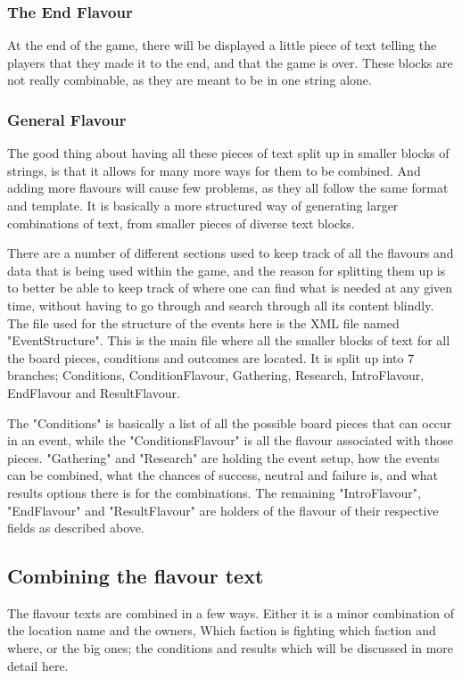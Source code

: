 \subsubsection{The End Flavour}
At the end of the game, there will be displayed a little piece of text telling the players that they made it to the end, and that the game is over. These blocks are not really combinable, as they are meant to be in one string alone.

\subsubsection{General Flavour}
The good thing about having all these pieces of text split up in smaller blocks of strings, is that it allows for many more ways for them to be combined. And adding more flavours will cause few problems, as they all follow the same format and template. It is basically a more structured way of generating larger combinations of text, from smaller pieces of diverse text blocks.

There are a number of different sections used to keep track of all the flavours and data that is being used within the game, and the reason for splitting them up is to better be able to keep track of where one can find what is needed at any given time, without having to go through and search through all its content blindly.
The file used for the structure of the events here is the XML file named "EventStructure". This is the main file where all the smaller blocks of text for all the board pieces, conditions and outcomes are located. It is split up into 7 branches; Conditions, ConditionFlavour, Gathering, Research, IntroFlavour, EndFlavour and ResultFlavour.

The "Conditions" is basically a list of all the possible board pieces that can occur in an event, while the "ConditionsFlavour" is all the flavour associated with those pieces.
"Gathering" and "Research" are holding the event setup, how the events can be combined, what the chances of success, neutral and failure is, and what results options there is for the combinations.
The remaining "IntroFlavour", "EndFlavour" and "ResultFlavour" are holders of the flavour of their respective fields as described above.

\subsection{Combining the flavour text}
The flavour texts are combined in a few ways. Either it is a minor combination of the location name and the owners, Which faction is fighting which faction and where, or the big ones; the conditions and results which will be discussed in more detail here.
